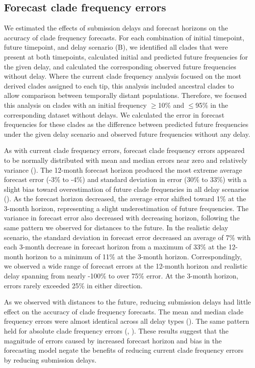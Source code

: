 \documentclass[9pt,lineno]{elife}
\begin{document}
\subsection{Forecast clade frequency errors}

We estimated the effects of submission delays and forecast horizons on the accuracy of clade frequency forecasts.
For each combination of initial timepoint, future timepoint, and delay scenario (B), we identified all clades that were present at both timepoints, calculated initial and predicted future frequencies for the given delay, and calculated the corresponding observed future frequencies without delay.
Where the current clade frequency analysis focused on the most derived clades assigned to each tip, this analysis included ancestral clades to allow comparison between temporally distant populations.
Therefore, we focused this analysis on clades with an initial frequency $\ge$10\% and $\le$95\% in the corresponding dataset without delays.
We calculated the error in forecast frequencies for these clades as the difference between predicted future frequencies under the given delay scenario and observed future frequencies without any delay.

As with current clade frequency errors, forecast clade frequency errors appeared to be normally distributed with mean and median errors near zero and relatively variance ().
The 12-month forecast horizon produced the most extreme average forecast error (-3\% to -4\%) and standard deviation in error (30\% to 33\%) with a slight bias toward overestimation of future clade frequencies in all delay scenarios ().
As the forecast horizon decreased, the average error shifted toward 1\% at the 3-month horizon, representing a slight underestimation of future frequencies.
The variance in forecast error also decreased with decreasing horizon, following the same pattern we observed for distances to the future.
In the realistic delay scenario, the standard deviation in forecast error decreased an average of 7\% with each 3-month decrease in forecast horizon from a maximum of 33\% at the 12-month horizon to a minimum of 11\% at the 3-month horizon.
Correspondingly, we observed a wide range of forecast errors at the 12-month horizon and realistic delay spanning from nearly -100\% to over 75\% error.
At the 3-month horizon, errors rarely exceeded 25\% in either direction.

As we observed with distances to the future, reducing submission delays had little effect on the accuracy of clade frequency forecasts.
The mean and median clade frequency errors were almost identical across all delay types ().
The same pattern held for absolute clade frequency errors (, ).
These results suggest that the magnitude of errors caused by increased forecast horizon and bias in the forecasting model negate the benefits of reducing current clade frequency errors by reducing submission delays.
\end{document}
